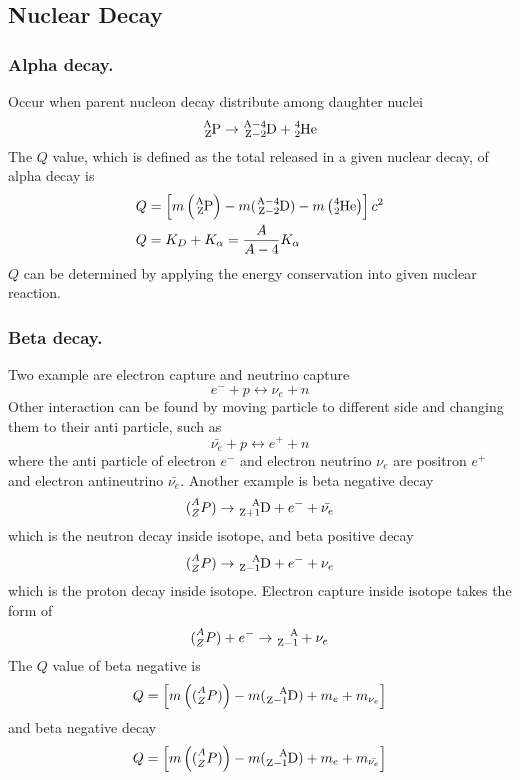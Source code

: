 \documentclass[../../../main.tex]{subfiles}
\begin{document}
\subsection{Nuclear Decay}

\subsubsection{Alpha decay.} Occur when parent nucleon decay distribute among daughter nuclei 
\begin{equation*}
    \ce{^A_ZP}\rightarrow\ce{^{A-4}_{Z-2}D}+\ce{^4_2He}
\end{equation*}
The $Q$ value, which is defined as the total released in a given nuclear decay, of alpha decay is 
\begin{align*}
    Q&=\left[m\left(\ce{^A_ZP}\right)-m(\ce{^{A-4}_{Z-2}D})-m\left(\ce{^4_2He}\right)\right]c^2\\
    Q&=K_D+K_\alpha=\frac{A}{A-4}K_\alpha
\end{align*}
$Q$ can be determined by applying the energy conservation into given nuclear reaction. 

\subsubsection{Beta decay.} Two example are electron capture and neutrino capture 
\begin{equation*}
    e^-+p\leftrightarrow \nu_e+n
\end{equation*} 
Other interaction can be found by moving particle to different side and changing them to their anti particle, such as 
\begin{equation*}
    \bar{\nu_e}+p\leftrightarrow e^++n
\end{equation*}
where the anti particle of electron $e^-$ and electron neutrino $\nu_e$ are positron $e^+$ and electron antineutrino $\bar{\nu_e}$. Another example is beta negative decay
\begin{equation*}
    \ce(^A_ZP)\rightarrow\ce{^A_{Z+1}D}+e^-+\bar{\nu_e}
\end{equation*} 
which is the neutron decay inside isotope, and beta positive decay
\begin{equation*}
    \ce(^A_ZP)\rightarrow\ce{^A_{Z-1}D}+e^-+{\nu_e}
\end{equation*}
which is the proton decay inside isotope. Electron capture inside isotope takes the form of 
\begin{equation*}
    \ce(^A_ZP)+e^-\rightarrow \ce{^A_{Z-1}}+\nu_e
\end{equation*}
The $Q$ value of beta negative is 
\begin{equation*}
    Q=\left[m\left(\ce(^A_ZP)\right)-m(\ce{^A_{Z-1}D})+m_e+m_{\nu_e}\right]
\end{equation*}
and beta negative decay 
\begin{equation*}
    Q=\left[m\left(\ce(^A_ZP)\right)-m(\ce{^A_{Z-1}D})+m_e+m_{\bar{\nu_e}}\right]
\end{equation*}
\end{document}
